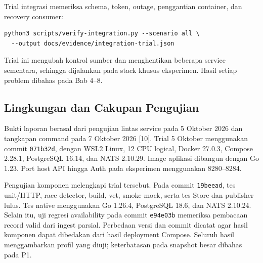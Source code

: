 \noindent\begin{minipage}{\textwidth}
Trial integrasi memeriksa schema, token, outage, penggantian container, dan recovery consumer:
\begin{lstlisting}
python3 scripts/verify-integration.py --scenario all \
  --output docs/evidence/integration-trial.json
\end{lstlisting}
\end{minipage}
Trial ini mengubah kontrol sumber dan menghentikan beberapa service sementara, sehingga dijalankan pada stack khusus eksperimen. Hasil setiap problem dibahas pada Bab 4--8.

\subsection{Lingkungan dan Cakupan Pengujian}
Bukti laporan berasal dari pengujian lintas service pada 5 Oktober 2026 dan tangkapan command pada 7 Oktober 2026 [10]. Trial 5 Oktober menggunakan commit \texttt{071b32d}, dengan WSL2 Linux, 12 CPU logical, Docker 27.0.3, Compose 2.28.1, PostgreSQL 16.14, dan NATS 2.10.29. Image aplikasi dibangun dengan Go 1.23. Port host API hingga Auth pada eksperimen menggunakan 8280--8284.

Pengujian komponen melengkapi trial tersebut. Pada commit \texttt{19beead}, tes unit/HTTP, race detector, build, vet, smoke mock, serta tes Store dan publisher lulus. Tes native menggunakan Go 1.26.4, PostgreSQL 18.6, dan NATS 2.10.24. Selain itu, uji regresi availability pada commit \texttt{e94e03b} memeriksa pembacaan record valid dari ingest parsial. Perbedaan versi dan commit dicatat agar hasil komponen dapat dibedakan dari hasil deployment Compose. Seluruh hasil menggambarkan profil yang diuji; keterbatasan pada snapshot besar dibahas pada P1.
